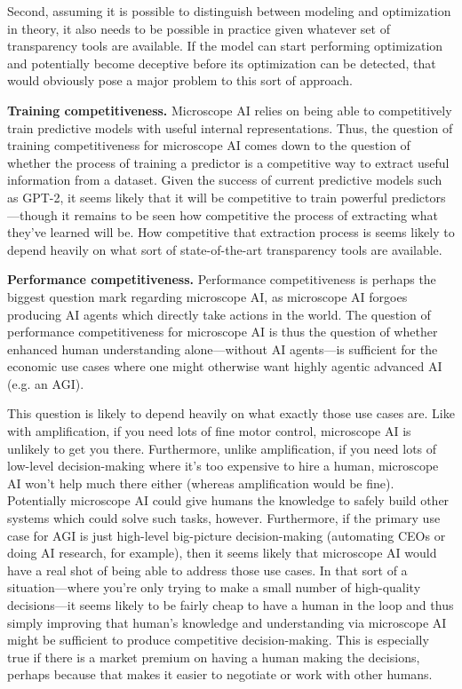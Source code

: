 Second, assuming it is possible to distinguish between modeling and optimization in theory, it also needs to be possible in practice given whatever set of transparency tools are available. If the model can start performing optimization and potentially become deceptive before its optimization can be detected, that would obviously pose a major problem to this sort of approach.

\textbf{Training competitiveness.} Microscope AI relies on being able to competitively train predictive models with useful internal representations. Thus, the question of training competitiveness for microscope AI comes down to the question of whether the process of training a predictor is a competitive way to extract useful information from a dataset. Given the success of current predictive models such as GPT-2\cite{TODO: cite https://openai.com/blog/better-language-models}, it seems likely that it will be competitive to train powerful predictors---though it remains to be seen how competitive the process of extracting what they've learned will be. How competitive that extraction process is seems likely to depend heavily on what sort of state-of-the-art transparency tools are available.

\textbf{Performance competitiveness.} Performance competitiveness is perhaps the biggest question mark regarding microscope AI, as microscope AI forgoes producing AI agents which directly take actions in the world. The question of performance competitiveness for microscope AI is thus the question of whether enhanced human understanding alone---without AI agents---is sufficient for the economic use cases where one might otherwise want highly agentic advanced AI (e.g. an AGI).

This question is likely to depend heavily on what exactly those use cases are. Like with amplification, if you need lots of fine motor control, microscope AI is unlikely to get you there. Furthermore, unlike amplification, if you need lots of low-level decision-making where it's too expensive to hire a human, microscope AI won't help much there either (whereas amplification would be fine). Potentially microscope AI could give humans the knowledge to safely build other systems which could solve such tasks, however. Furthermore, if the primary use case for AGI is just high-level big-picture decision-making (automating CEOs or doing AI research, for example), then it seems likely that microscope AI would have a real shot of being able to address those use cases. In that sort of a situation---where you're only trying to make a small number of high-quality decisions---it seems likely to be fairly cheap to have a human in the loop and thus simply improving that human's knowledge and understanding via microscope AI might be sufficient to produce competitive decision-making. This is especially true if there is a market premium on having a human making the decisions, perhaps because that makes it easier to negotiate or work with other humans.

